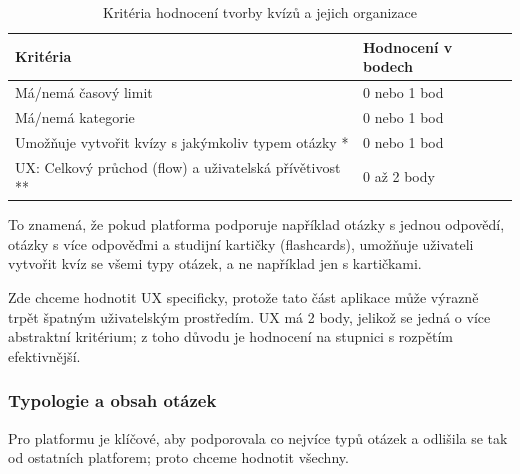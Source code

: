 \documentclass{vskpou} %
\begin{document}
\begin{table}[H]
\caption{Kritéria hodnocení tvorby kvízů a jejich organizace}
\label{tab:vytvareni}
\centering
\begin{threeparttable}
\begin{tabular}{|p{}|l|}
\hline
\textbf{Kritéria} & \textbf{Hodnocení v bodech} \\ \hline
Má/nemá časový limit & 0 nebo 1 bod \\ \hline
Má/nemá kategorie & 0 nebo 1 bod \\ \hline
Umožňuje vytvořit kvízy s jakýmkoliv typem otázky * & 0 nebo 1 bod \\ \hline
UX: Celkový průchod (flow) a uživatelská přívětivost ** & 0 až 2 body \\ \hline
\end{tabular}
\begin{tablenotes}[flushleft]
\footnotesize
\item[*] To znamená, že pokud platforma podporuje například otázky s jednou odpovědí, otázky s více odpověďmi a studijní kartičky (flashcards), umožňuje uživateli vytvořit kvíz se všemi typy otázek, a ne například jen s kartičkami.
\item[**] Zde chceme hodnotit UX specificky, protože tato část aplikace může výrazně trpět špatným uživatelským prostředím. UX má 2 body, jelikož se jedná o více abstraktní kritérium; z toho důvodu je hodnocení na stupnici s rozpětím efektivnější.
\end{tablenotes}
\end{threeparttable}
\end{table}

\subsubsection{Typologie a obsah otázek}

Pro platformu je klíčové, aby podporovala co nejvíce typů otázek a odlišila se tak od ostatních platforem; proto chceme hodnotit všechny.
\end{document}
